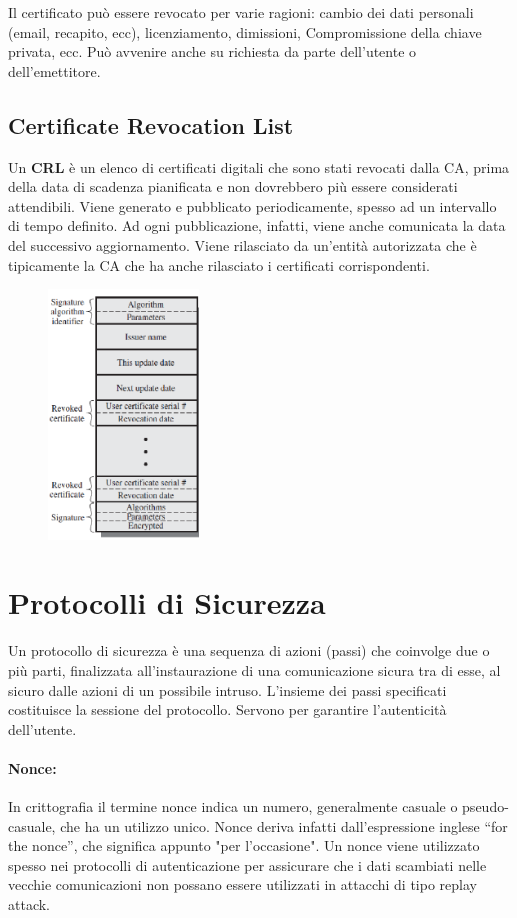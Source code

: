Il certificato può essere revocato per varie ragioni: cambio dei dati
personali (email, recapito, ecc),
licenziamento, dimissioni, Compromissione della chiave privata, ecc.
Può avvenire anche su richiesta da parte dell’utente o dell’emettitore.

\subsection{Certificate Revocation List}

Un \textbf{CRL} è un elenco di certificati digitali che sono stati revocati
dalla CA,
prima della data di scadenza pianificata e non dovrebbero più essere
considerati attendibili.
Viene generato e pubblicato periodicamente, spesso ad un intervallo di
tempo definito. Ad ogni
pubblicazione, infatti, viene anche comunicata la data del successivo
aggiornamento.
Viene rilasciato da un'entità autorizzata che è tipicamente la CA
che ha anche rilasciato i certificati
corrispondenti.

\begin{figure}[H]
    \centering
    \includegraphics[width=4cm, keepaspectratio]{capitoli/crittografia/imgs/CRL.png}
\end{figure}

\section{Protocolli di Sicurezza}

Un protocollo di sicurezza è una sequenza di azioni (passi) che
coinvolge due o più parti,
finalizzata all’instaurazione di una comunicazione sicura tra di esse,
al sicuro dalle azioni di un
possibile intruso. L’insieme dei passi specificati costituisce la sessione
del protocollo.
Servono per garantire l’autenticità dell’utente.

\paragraph{Nonce: }
In crittografia il termine nonce indica un numero, generalmente casuale
o pseudo-casuale,
che ha un utilizzo unico. Nonce deriva infatti dall'espressione inglese
“for the nonce”, che significa
appunto "per l'occasione". Un nonce viene utilizzato spesso nei protocolli
di autenticazione per
assicurare che i dati scambiati nelle vecchie comunicazioni non possano
essere utilizzati in
attacchi di tipo replay attack.\\

